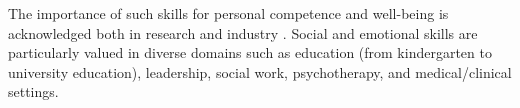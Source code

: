 \documentclass[prodmode,acmtochi]{acmsmall}
\newcommand{\todo}[1]{\textrm{\textrm{\textcolor{LightBlue}{[[#1]]}}}}
\begin{document}
The importance of such skills for personal competence and well-being is acknowledged both in research and industry \cite{Durlak2011,Greenberg2010,Stepien2006,Barth2011,Carey2011,Bono2009}. Social and emotional skills are particularly valued in diverse domains such as education (from kindergarten to university education), leadership, social work, psychotherapy, and medical/clinical settings. 

\end{document}
